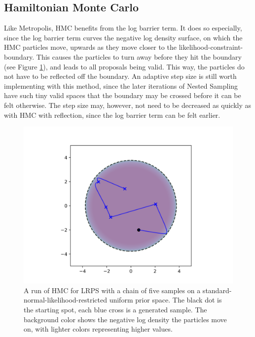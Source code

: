 \documentclass[12pt, a4paper]{report}
\begin{document}
\subsection{Hamiltonian Monte Carlo}
Like Metropolis, HMC benefits from the log barrier term.
It does so especially, since the log barrier term curves the negative log density surface, on which the HMC particles move, upwards as they move closer to the likelihood-constraint-boundary.
This causes the particles to turn away before they hit the boundary (see Figure \ref{fig:barrier_sampling_hmc}), and leads to all proposals being valid.
This way, the particles do not have to be reflected off the boundary.
An adaptive step size is still worth implementing with this method, since the later iterations of Nested Sampling have such tiny valid spaces that the boundary may be crossed before it can be felt otherwise.
The step size may, however, not need to be decreased as quickly as with HMC with reflection, since the log barrier term can be felt earlier.

\begin{figure}
    \centering
    \includegraphics[scale=0.8]{figs/barrier_sampling_hmc.png}
    \caption{A run of HMC for LRPS with a chain of five samples on a standard-normal-likelihood-restricted uniform prior space.
    The black dot is the starting spot, each blue cross is a generated sample.
    The background color shows the negative log density the particles move on, with lighter colors representing higher values.}
    \label{fig:barrier_sampling_hmc}
\end{figure}

\FloatBarrier
\end{document}
